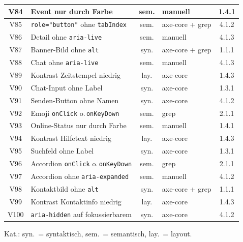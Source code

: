 \begin{longtable}{|c|p{5.8cm}|c|p{3.6cm}|c|}
V84  & Event nur durch Farbe                     & sem. & manuell                 & 1.4.1 \\ \hline
V85  & \texttt{role="button"} ohne \texttt{tabIndex} & sem. & axe-core + grep  & 4.1.2 \\ \hline
V86  & Detail ohne \texttt{aria-live}            & sem. & manuell                 & 4.1.3 \\ \hline
V87  & Banner-Bild ohne \texttt{alt}             & syn. & axe-core + grep         & 1.1.1 \\ \hline
V88  & Chat ohne \texttt{aria-live}              & sem. & manuell                 & 4.1.3 \\ \hline
V89  & Kontrast Zeitstempel niedrig              & lay. & axe-core                & 1.4.3 \\ \hline
V90  & Chat-Input ohne Label                     & syn. & axe-core                & 1.3.1 \\ \hline
V91  & Senden-Button ohne Namen                  & syn. & axe-core                & 4.1.2 \\ \hline
V92  & Emoji \texttt{onClick} o.\,\texttt{onKeyDown} & sem. & grep            & 2.1.1 \\ \hline
V93  & Online-Status nur durch Farbe             & sem. & manuell                 & 1.4.1 \\ \hline
V94  & Kontrast Hilfetext niedrig                & lay. & axe-core                & 1.4.3 \\ \hline
V95  & Suchfeld ohne Label                       & syn. & axe-core                & 1.3.1 \\ \hline
V96  & Accordion \texttt{onClick} o.\,\texttt{onKeyDown} & sem. & grep       & 2.1.1 \\ \hline
V97  & Accordion ohne \texttt{aria-expanded}     & sem. & manuell                 & 4.1.2 \\ \hline
V98  & Kontaktbild ohne \texttt{alt}             & syn. & axe-core + grep         & 1.1.1 \\ \hline
V99  & Kontrast Kontaktinfo niedrig              & lay. & axe-core                & 1.4.3 \\ \hline
V100 & \texttt{aria-hidden} auf fokussierbarem   & syn. & axe-core                & 4.1.2 \\ \hline
\end{longtable}
\begin{center}\footnotesize Kat.: syn.\ = syntaktisch, sem.\ = semantisch, lay.\ = layout.\end{center}

